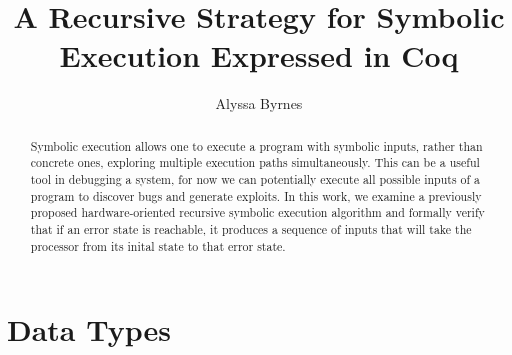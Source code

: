 \documentclass[a4paper]{article}
\title{A Recursive Strategy for Symbolic Execution Expressed in Coq}
\author{Alyssa Byrnes}
\begin{document}
\maketitle

\begin{abstract}
Symbolic execution allows one to execute a program with symbolic inputs, rather than concrete ones, exploring multiple execution paths simultaneously. This can be a useful tool in debugging a system, for now we can potentially execute all possible inputs of a program to discover bugs and generate exploits. In this work, we examine a previously proposed hardware-oriented recursive symbolic execution algorithm and formally verify that if an error state is reachable, it produces a sequence of inputs that will take the processor from its inital state to that error state.
\end{abstract}


\section{Data Types}
\end{document}
